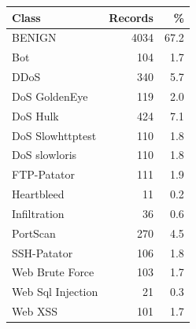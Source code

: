 \begin{tabular}{lrr}
\toprule
Class & Records & \% \\
\midrule
BENIGN & 4034 & 67.2 \\
Bot & 104 & 1.7 \\
DDoS & 340 & 5.7 \\
DoS GoldenEye & 119 & 2.0 \\
DoS Hulk & 424 & 7.1 \\
DoS Slowhttptest & 110 & 1.8 \\
DoS slowloris & 110 & 1.8 \\
FTP-Patator & 111 & 1.9 \\
Heartbleed & 11 & 0.2 \\
Infiltration & 36 & 0.6 \\
PortScan & 270 & 4.5 \\
SSH-Patator & 106 & 1.8 \\
Web Brute Force & 103 & 1.7 \\
Web Sql Injection & 21 & 0.3 \\
Web XSS & 101 & 1.7 \\
\bottomrule
\end{tabular}
